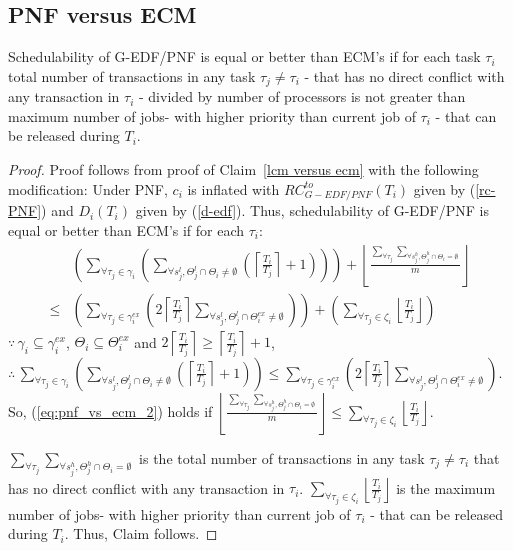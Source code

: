 \subsection{PNF versus ECM\label{pnf vs ecm sec}}
%
\begin{clm}\label{PNF ecf comaprison clm}
%
Schedulability of G-EDF/PNF is equal or better than ECM's if for each task $\tau_i$ total number of transactions in any task $\tau_{j}\neq\tau_{i}$ - that has no direct conflict with any transaction in $\tau_{i}$ - divided by number of processors is not greater than maximum number of jobs- with higher priority than current job of $\tau_{i}$ - that can be released during $T_{i}$.
%
\end{clm}
%
\begin{proof}\normalfont
%
Proof follows from proof of Claim~\ref{lcm versus ecm} with the following modification: Under PNF, $c_i$ is inflated with $RC_{G-EDF/PNF}^{to}(T_i)$ given by (\ref{rc-PNF}) and $D_i(T_i)$ given by (\ref{d-edf}). Thus, schedulability of G-EDF/PNF is equal or better than ECM's if for each $\tau_i$:
%
\begin{eqnarray}
 & \left(\sum_{\forall\tau_{j}\in\gamma_{i}}\left(\sum_{\forall s_{j}^{l},\Theta_{j}^{l}\cap\Theta_{i}\neq\emptyset}\left(\left\lceil \frac{T_{i}}{T_{j}}\right\rceil +1\right)\right)\right)+\left\lfloor \frac{\sum_{\forall\tau_{j}}\sum_{\forall s_{j}^{h},\Theta_{j}^{h}\cap\Theta_{i}=\emptyset}}{m}\right\rfloor \nonumber \\
\le & \left(\sum_{\forall\tau_{j}\in\gamma_{i}^{ex}}\left(2\left\lceil \frac{T_{i}}{T_{j}}\right\rceil \sum_{\forall s_{j}^{l},\Theta_{j}^{l}\cap\Theta_{i}^{ex}\neq\emptyset}\right)\right)+\left(\sum_{\forall\tau_{j}\in\zeta_{i}}\left\lfloor \frac{T_{i}}{T_{j}}\right\rfloor \right)\label{eq:pnf_vs_ecm_2}
\end{eqnarray}
%
$\because\,\gamma_{i}\subseteq\gamma_{i}^{ex}$, $\Theta_{i}\subseteq\Theta_{i}^{ex}$
and $2\left\lceil \frac{T_{i}}{T_{j}}\right\rceil \ge\left\lceil \frac{T_{i}}{T_{j}}\right\rceil +1$,
$\therefore\,\sum_{\forall\tau_{j}\in\gamma_{i}}\left(\sum_{\forall s_{j}^{l},\Theta_{j}^{l}\cap\Theta_{i}\neq\emptyset}\left(\left\lceil \frac{T_{i}}{T_{j}}\right\rceil +1\right)\right)\le\sum_{\forall\tau_{j}\in\gamma_{i}^{ex}}\left(2\left\lceil \frac{T_{i}}{T_{j}}\right\rceil \sum_{\forall s_{j}^{l},\Theta_{j}^{l}\cap\Theta_{i}^{ex}\neq\emptyset}\right)$.
So, (\ref{eq:pnf_vs_ecm_2}) holds if $\left\lfloor \frac{\sum_{\forall\tau_{j}}\sum_{\forall s_{j}^{h},\Theta_{j}^{h}\cap\Theta_{i}=\emptyset}}{m}\right\rfloor \le\sum_{\forall\tau_{j}\in\zeta_{i}}\left\lfloor \frac{T_{i}}{T_{j}}\right\rfloor $.

$\sum_{\forall\tau_{j}}\sum_{\forall s_{j}^{h},\Theta_{j}^{h}\cap\Theta_{i}=\emptyset}$
is the total number of transactions in any task $\tau_{j}\neq\tau_{i}$
that has no direct conflict with any transaction in $\tau_{i}$. $\sum_{\forall\tau_{j}\in\zeta_{i}}\left\lfloor \frac{T_{i}}{T_{j}}\right\rfloor $
is the maximum number of jobs- with higher priority than current job of $\tau_{i}$ - that can be released during $T_{i}$. Thus, Claim follows.
%
\end{proof}
%
